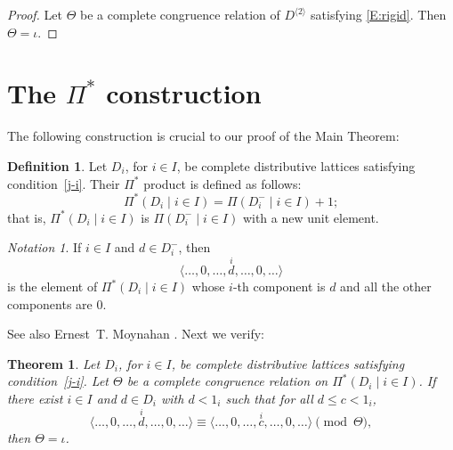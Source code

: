 \documentclass{amsart}
\theoremstyle{plain}
\newtheorem{theorem}{Theorem}
\theoremstyle{definition}
\newtheorem{definition}{Definition}
\theoremstyle{remark}
\newtheorem*{notation}{Notation}
\numberwithin{equation}{section}
\begin{document}
\begin{proof}
   Let $\Theta$ be a complete congruence relation of 
   $D^{\langle 2 \rangle}$ satisfying \eqref{E:rigid}. Then $\Theta =
\iota$. 
\end{proof}

\section{The $\Pi^{*}$ construction}\label{S:P*} 
The following construction is crucial to our proof of the Main Theorem:

\begin{definition}\label{D:P*} 
   Let $D_{i}$, for $i \in I$, be complete distributive lattices 
   satisfying condition~\eqref{j-i}.  Their $\Pi^{*}$ product is defined
as follows:
   \[
      \Pi^{*} ( D_{i} \mid i \in I ) = \Pi ( D_{i}^{-} \mid i \in I ) + 1;
   \]
   that is, $\Pi^{*} ( D_{i} \mid i \in I )$ is $\Pi ( D_{i}^{-} \mid 
   i \in I )$ with a new unit element. 
\end{definition}

\begin{notation} 
   If $i \in I$ and $d \in D_{i}^{-}$, then
   \[
      \langle \dots, 0, \dots, \overset{i}{d}, \dots, 0, \dots \rangle
   \]
   is the element of $\Pi^{*} ( D_{i} \mid i \in I )$ whose $i$-th 
   component is $d$ and all the other components are $0$.
\end{notation}

See also Ernest~T. Moynahan \cite{eM57a}.  Next we verify:

\begin{theorem}\label{T:P*} 
   Let $D_{i}$, for $i \in I$, be complete distributive lattices 
   satisfying condition~\eqref{j-i}.  Let $\Theta$ be a complete
congruence
   relation on $\Pi^{*} ( D_{i} \mid i \in I )$.  If there exist  
   $i \in I$ and $d \in D_{i}$ with $d < 1_{i}$ such that for
   all $d \leq c < 1_{i}$, 
   \begin{equation}\label{E:cong1} 
      \langle \dots, 0, \dots,\overset{i}{d},
      \dots, 0, \dots \rangle \equiv \langle \dots, 0, \dots,
      \overset{i}{c}, \dots, 0, \dots \rangle \pmod{\Theta}, 
   \end{equation}
   then $\Theta = \iota$.
\end{theorem}
\end{document}
